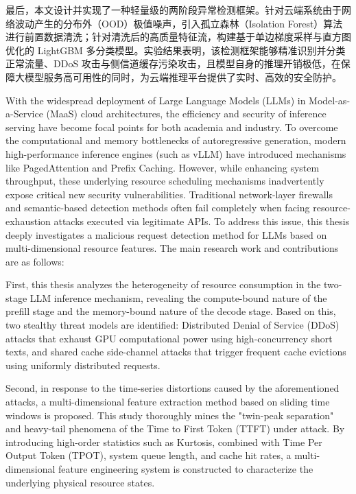 \documentclass[master, vlined]{DissertUESTC}
\begin{document}
	最后，本文设计并实现了一种轻量级的两阶段异常检测框架。针对云端系统由于网络波动产生的分布外（OOD）极值噪声，引入孤立森林（Isolation Forest）算法进行前置数据清洗；针对清洗后的高质量特征流，构建基于单边梯度采样与直方图优化的 LightGBM 多分类模型。实验结果表明，该检测框架能够精准识别并分类正常流量、DDoS 攻击与侧信道缓存污染攻击，且模型自身的推理开销极低，在保障大模型服务高可用性的同时，为云端推理平台提供了实时、高效的安全防护。

	
	
	\enabstract
	
	With the widespread deployment of Large Language Models (LLMs) in Model-as-a-Service (MaaS) cloud architectures, the efficiency and security of inference serving have become focal points for both academia and industry. To overcome the computational and memory bottlenecks of autoregressive generation, modern high-performance inference engines (such as vLLM) have introduced mechanisms like PagedAttention and Prefix Caching. However, while enhancing system throughput, these underlying resource scheduling mechanisms inadvertently expose critical new security vulnerabilities. Traditional network-layer firewalls and semantic-based detection methods often fail completely when facing resource-exhaustion attacks executed via legitimate APIs. To address this issue, this thesis deeply investigates a malicious request detection method for LLMs based on multi-dimensional resource features. The main research work and contributions are as follows:

	First, this thesis analyzes the heterogeneity of resource consumption in the two-stage LLM inference mechanism, revealing the compute-bound nature of the prefill stage and the memory-bound nature of the decode stage. Based on this, two stealthy threat models are identified: Distributed Denial of Service (DDoS) attacks that exhaust GPU computational power using high-concurrency short texts, and shared cache side-channel attacks that trigger frequent cache evictions using uniformly distributed requests.

	Second, in response to the time-series distortions caused by the aforementioned attacks, a multi-dimensional feature extraction method based on sliding time windows is proposed. This study thoroughly mines the "twin-peak separation" and heavy-tail phenomena of the Time to First Token (TTFT) under attack. By introducing high-order statistics such as Kurtosis, combined with Time Per Output Token (TPOT), system queue length, and cache hit rates, a multi-dimensional feature engineering system is constructed to characterize the underlying physical resource states.
\end{document}
